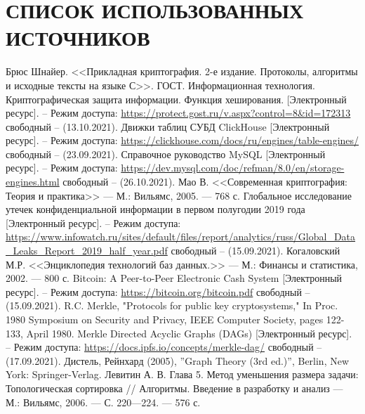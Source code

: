 \section*{СПИСОК ИСПОЛЬЗОВАННЫХ ИСТОЧНИКОВ}

\begingroup
\renewcommand{\section}[2]{}
\begin{thebibliography}{}
    Брюс Шнайер. <<Прикладная криптография. 2-е издание. Протоколы, алгоритмы и исходные тексты на языке С>>.
    ГОСТ. Информационная технология. Криптографическая защита информации. Функция хеширования. [Электронный ресурс]. – Режим доступа: \url{https://protect.gost.ru/v.aspx?control=8&id=172313} свободный – (13.10.2021).
    Движки таблиц СУБД ClickHouse [Электронный ресурс]. – Режим доступа: \url{https://clickhouse.com/docs/ru/engines/table-engines/} свободный – (23.09.2021).
    Справочное руководство MySQL [Электронный ресурс]. – Режим доступа: \url{https://dev.mysql.com/doc/refman/8.0/en/storage-engines.html} свободный – (26.10.2021).
    Мао В. <<Современная криптография: Теория и практика>> — М.: Вильямс, 2005. — 768 с.
    Глобальное исследование утечек конфиденциальной информации в первом полугодии 2019 года [Электронный ресурс]. – Режим доступа: \url{https://www.infowatch.ru/sites/default/files/report/analytics/russ/Global_Data_Leaks_Report_2019_half_year.pdf} свободный – (15.09.2021).
    Когаловский М.Р. <<Энциклопедия технологий баз данных.>> — М.: Финансы и статистика, 2002. — 800 с.
    Bitcoin: A Peer-to-Peer Electronic Cash System [Электронный ресурс]. – Режим доступа: \url{https://bitcoin.org/bitcoin.pdf} свободный – (15.09.2021).
    R.C. Merkle, "Protocols for public key cryptosystems," In Proc. 1980 Symposium on Security and Privacy, IEEE Computer Society, pages 122-133, April 1980.
    Merkle Directed Acyclic Graphs (DAGs) [Электронный ресурс]. – Режим доступа: \url{https://docs.ipfs.io/concepts/merkle-dag/} свободный – (17.09.2021).
    Дистель, Рейнхард (2005), ''Graph Theory (3rd ed.)'', Berlin, New York: Springer-Verlag.
    Левитин А. В. Глава 5. Метод уменьшения размера задачи: Топологическая сортировка // Алгоритмы. Введение в разработку и анализ — М.: Вильямс, 2006. — С. 220—224. — 576 с.

\end{thebibliography}
